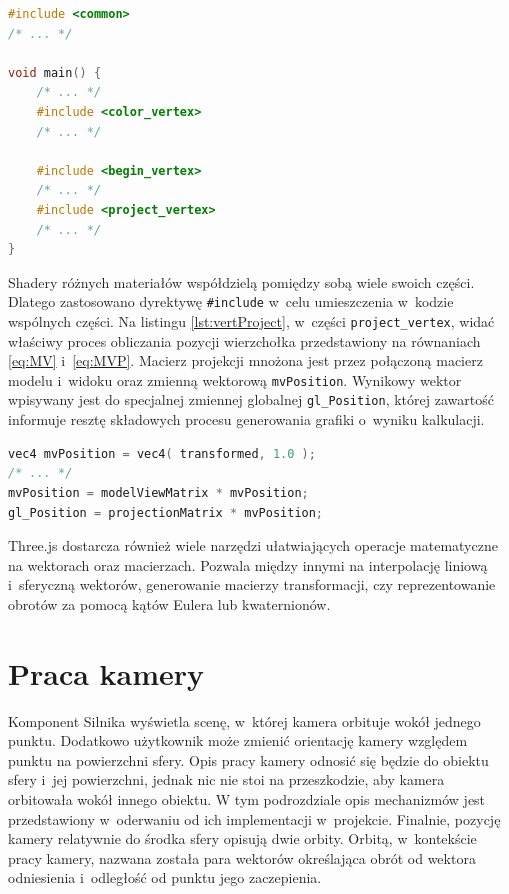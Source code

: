 \begin{lstlisting}[language=C++, label={lst:matVert}, caption={
    Fragmenty vertex shadera materiału \texttt{MeshBasicMaterial}}
]
#include <common>
/* ... */

void main() {
    /* ... */
	#include <color_vertex>
    /* ... */

	#include <begin_vertex>
	/* ... */
	#include <project_vertex>
	/* ... */
}
\end{lstlisting}

Shadery różnych materiałów współdzielą pomiędzy sobą wiele swoich części. Dlatego zastosowano dyrektywę \texttt{\#include} w~celu umieszczenia w~kodzie wspólnych części. Na listingu \ref{lst:vertProject}, w~części \texttt{project\_vertex}, widać właściwy proces obliczania pozycji wierzchołka przedstawiony na równaniach \ref{eq:MV} i~\ref{eq:MVP}. Macierz projekcji mnożona jest przez połączoną macierz modelu i~widoku oraz zmienną wektorową \texttt{mvPosition}. Wynikowy wektor wpisywany jest do specjalnej zmiennej globalnej \texttt{gl\_Position}, której zawartość informuje resztę składowych procesu generowania grafiki o~wyniku kalkulacji. 

\begin{lstlisting}[language=C++, label={lst:vertProject}, caption={
    Fragmenty części \texttt{project\_vertex} vertex shadera}
]
vec4 mvPosition = vec4( transformed, 1.0 );
/* ... */
mvPosition = modelViewMatrix * mvPosition;
gl_Position = projectionMatrix * mvPosition;
\end{lstlisting}

Three.js dostarcza również wiele narzędzi ułatwiających operacje matematyczne na wektorach oraz macierzach. Pozwala między innymi na interpolację liniową i~sferyczną wektorów, generowanie macierzy transformacji, czy reprezentowanie obrotów za pomocą kątów Eulera lub kwaternionów.

\section{Praca kamery}
\label{sec:camera}

Komponent Silnika wyświetla scenę, w~której kamera orbituje wokół jednego punktu. Dodatkowo użytkownik może zmienić orientację kamery względem punktu na powierzchni sfery. Opis pracy kamery odnosić się będzie do obiektu sfery i~jej powierzchni, jednak nic nie stoi na przeszkodzie, aby kamera orbitowała wokół innego obiektu. W tym podrozdziale opis mechanizmów jest przedstawiony w~oderwaniu od ich implementacji w~projekcie. Finalnie, pozycję kamery relatywnie do środka sfery opisują dwie orbity. Orbitą, w~kontekście pracy kamery, nazwana została para wektorów określająca obrót od wektora odniesienia i~odległość od punktu jego zaczepienia.

